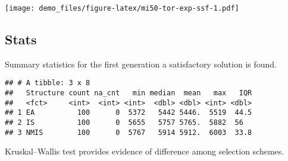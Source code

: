 \documentclass[]{book}
\newenvironment{Shaded}{\begin{snugshade}}{\end{snugshade}}
\newcommand{\CharTok}[1]{\textcolor[rgb]{0.31,0.60,0.02}{#1}}
\newcommand{\DataTypeTok}[1]{\textcolor[rgb]{0.13,0.29,0.53}{#1}}
\newcommand{\DecValTok}[1]{\textcolor[rgb]{0.00,0.00,0.81}{#1}}
\newcommand{\KeywordTok}[1]{\textcolor[rgb]{0.13,0.29,0.53}{\textbf{#1}}}
\newcommand{\NormalTok}[1]{#1}
\newcommand{\OperatorTok}[1]{\textcolor[rgb]{0.81,0.36,0.00}{\textbf{#1}}}
\newcommand{\OtherTok}[1]{\textcolor[rgb]{0.56,0.35,0.01}{#1}}
\newcommand{\StringTok}[1]{\textcolor[rgb]{0.31,0.60,0.02}{#1}}
\begin{document}
\texttt{[image: demo\_files/figure-latex/mi50-tor-exp-ssf-1.pdf]}

\hypertarget{stats-29}{%
\subsection{Stats}\label{stats-29}}

Summary statistics for the first generation a satisfactory solution is found.

\begin{Shaded}
\end{Shaded}

\begin{verbatim}
## # A tibble: 3 x 8
##   Structure count na_cnt   min median  mean   max   IQR
##   <fct>     <int>  <int> <int>  <dbl> <dbl> <int> <dbl>
## 1 EA          100      0  5372   5442 5446.  5519  44.5
## 2 IS          100      0  5655   5757 5765.  5882  56  
## 3 NMIS        100      0  5767   5914 5912.  6003  33.8
\end{verbatim}

Kruskal--Wallis test provides evidence of difference among selection schemes.
\end{document}
